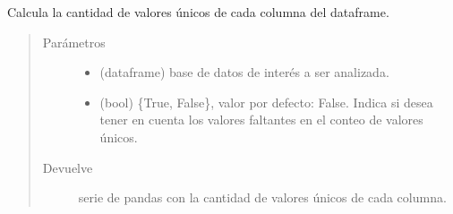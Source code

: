 \documentclass[letterpaper,10pt,openany,spanish]{sphinxmanual}
\begin{document}

\begin{fulllineitems}
\label{\detokenize{datos:datos.unicos}}
Calcula la cantidad de valores únicos de cada columna del dataframe.
\begin{quote}\begin{description}
\item[{Parámetros}] \leavevmode\begin{itemize}
\item {} 
 \textendash{} (dataframe) base de datos de interés a ser analizada.

\item {} 
 \textendash{} (bool) \{True, False\}, valor por defecto: False. Indica si desea tener en cuenta los valores faltantes en el conteo de valores únicos.

\end{itemize}

\item[{Devuelve}] \leavevmode
serie de pandas con la cantidad de valores únicos de cada columna.

\end{description}\end{quote}

\end{fulllineitems}

\end{document}
